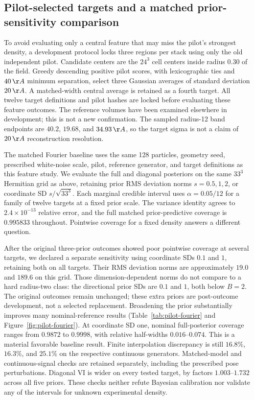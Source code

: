 \subsection{Pilot-selected targets and a matched prior-sensitivity comparison}
\label{sec:pilotselected}
To avoid evaluating only a central feature that may miss the pilot's strongest
density, a development protocol locks three regions per stack using only the
old independent pilot. Candidate centers are the $24^3$ cell centers inside
radius $0.30$ of the field. Greedy descending positive pilot scores, with
lexicographic ties and $40\,\AA$ minimum separation, select three Gaussian
averages of standard deviation $20\,\AA$. A matched-width central average is
retained as a fourth target. All twelve target definitions and pilot hashes
are locked before evaluating these feature outcomes. The reference volumes
have been examined elsewhere in development; this is not a new confirmation.
The sampled radius-12 band endpoints are $40.2$, $19.68$, and $34.93\,\AA$,
so the target sigma is not a claim of $20\,\AA$ reconstruction resolution.

The matched Fourier baseline uses the same 128 particles, geometry seed,
prescribed white-noise scale, pilot, reference generator, and target definitions
as this feature study. We evaluate the full and diagonal posteriors on the
same $33^3$ Hermitian grid as above, retaining prior RMS deviation norms
$s=0.5,1,2$, or coordinate SD $s/\sqrt{33^3}$. Each marginal credible interval
uses $\alpha=0.05/12$ for a family of twelve targets at a fixed prior scale.
The variance identity agrees to $2.4\times10^{-13}$ relative error, and the
full matched prior-predictive coverage is $0.995833$ throughout.
Pointwise coverage for a fixed density answers a different question.

After the original three-prior outcomes showed poor pointwise coverage at
several targets, we declared a separate sensitivity using coordinate SDs
$0.1$ and $1$, retaining both on all targets. Their RMS deviation norms are
approximately $19.0$ and $189.6$ on this grid. Those dimension-dependent norms do not compare to a hard radius-two class: the directional prior SDs are $0.1$ and $1$, both below $B=2$.
The original outcomes remain unchanged; these extra priors are post-outcome
development, not a selected replacement. Broadening the prior substantially
improves many nominal-reference results (Table~\ref{tab:pilot-fourier} and
Figure~\ref{fig:pilot-fourier}). At coordinate SD one, nominal full-posterior
coverage ranges from $0.9872$ to $0.9998$, with relative half-widths
$0.016$--$0.074$. This is a material favorable baseline result.
Finite interpolation discrepancy is still $16.8\%$, $16.3\%$, and $25.1\%$
on the respective continuous generators. Matched-model and continuous-signal
checks are retained separately, including the prescribed pose perturbations.
Diagonal VI is wider on every tested target, by factors $1.003$--$1.732$
across all five priors. These checks neither refute Bayesian calibration nor
validate any of the intervals for unknown experimental density.

